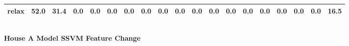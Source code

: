 \documentclass{article}
\begin{document}
\begin{sideways}
\begin{tabular}{lrrrrrrrrrrrrrrrrrr}
relax                         &        52.0 &               31.4 &           0.0 &                          0.0 &                0.0 &                0.0 &                        0.0 &          0.0 &              0.0 &                0.0 &                    0.0 &                      0.0 &                  0.0 &                   0.0 &              0.0 &              0.0 &                                  0.0 &         16.5 \\
\bottomrule
\end{tabular}
\end{sideways}
\normalsize
\vspace{1cm}\\
\textbf{House A Model SSVM Feature Change}\\
\vspace{1cm}\\
\end{document}
